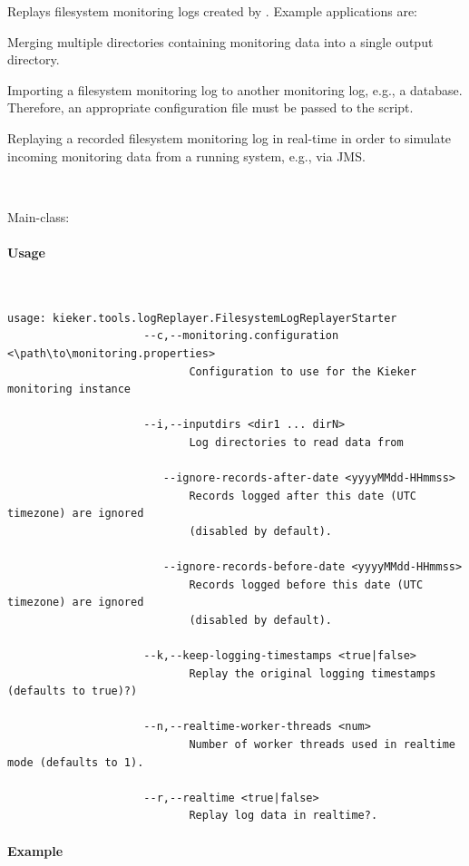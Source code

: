 			Replays filesystem monitoring logs created by \KiekerMonitoringPart{}. Example applications are:
			\begin{compactitem}
				\item 
				Merging multiple directories containing monitoring data into a single output directory. 
				\item 
				Importing a filesystem monitoring log to another monitoring log, e.g., a database. Therefore, an appropriate \KiekerMonitoringPart{} configuration	file must be passed to the script.
				\item 
				Replaying a recorded filesystem monitoring log in real-time in order to simulate incoming monitoring data from a running system, e.g., via JMS. 
			\end{compactitem}

			\

			\noindent Main-class: {\small {}}

			\paragraph*{Usage}\

				\setTextListing
				\begin{lstlisting}[gobble = 10]
					usage: kieker.tools.logReplayer.FilesystemLogReplayerStarter
					 --c,--monitoring.configuration <\path\to\monitoring.properties>
							Configuration to use for the Kieker monitoring instance

					 --i,--inputdirs <dir1 ... dirN>
							Log directories to read data from

						--ignore-records-after-date <yyyyMMdd-HHmmss>
							Records logged after this date (UTC timezone) are ignored
							(disabled by default).

						--ignore-records-before-date <yyyyMMdd-HHmmss>
							Records logged before this date (UTC timezone) are ignored
							(disabled by default).

					 --k,--keep-logging-timestamps <true|false>
							Replay the original logging timestamps (defaults to true)?)

					 --n,--realtime-worker-threads <num>
							Number of worker threads used in realtime mode (defaults to 1).

					 --r,--realtime <true|false>
							Replay log data in realtime?. 
				\end{lstlisting}

			\paragraph*{Example}\

